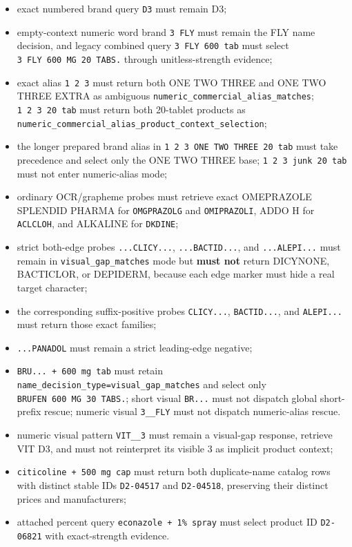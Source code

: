 \begin{itemize}
\item
  exact numbered brand query \texttt{D3} must remain D3;
\item
  empty-context numeric word brand \texttt{3\ FLY} must remain the FLY name decision, and legacy combined query \texttt{3\ FLY\ 600\ tab} must select \texttt{3\ FLY\ 600\ MG\ 20\ TABS.} through unitless-strength evidence;
\item
  exact alias \texttt{1\ 2\ 3} must return both ONE TWO THREE and ONE TWO THREE EXTRA as ambiguous \texttt{numeric\_\allowbreak{}commercial\_\allowbreak{}alias\_\allowbreak{}matches}; \texttt{1\ 2\ 3\ 20\ tab} must return both 20-tablet products as \texttt{numeric\_\allowbreak{}commercial\_\allowbreak{}alias\_\allowbreak{}product\_\allowbreak{}context\_\allowbreak{}selection};
\item
  the longer prepared brand alias in \texttt{1\ 2\ 3\ ONE\ TWO\ THREE\ 20\ tab} must take precedence and select only the ONE TWO THREE base; \texttt{1\ 2\ 3\ junk\ 20\ tab} must not enter numeric-alias mode;
\item
  ordinary OCR/grapheme probes must retrieve exact OMEPRAZOLE SPLENDID PHARMA for \texttt{OMGPRAZOLG} and \texttt{OMIPRAZOLI}, ADDO H for \texttt{ACLCLOH}, and ALKALINE for \texttt{DKDINE};
\item
  strict both-edge probes \texttt{...CLICY...}, \texttt{...BACTID...}, and \texttt{...ALEPI...} must remain in \texttt{visual\_\allowbreak{}gap\_\allowbreak{}matches} mode but \textbf{must not} return DICYNONE, BACTICLOR, or DEPIDERM, because each edge marker must hide a real target character;
\item
  the corresponding suffix-positive probes \texttt{CLICY...}, \texttt{BACTID...}, and \texttt{ALEPI...} must return those exact families;
\item
  \texttt{...PANADOL} must remain a strict leading-edge negative;
\item
  \texttt{BRU...\ +\ 600\ mg\ tab} must retain \texttt{name\_\allowbreak{}decision\_\allowbreak{}type=visual\_\allowbreak{}gap\_\allowbreak{}matches} and select only \texttt{BRUFEN\ 600\ MG\ 30\ TABS.}; short visual \texttt{BR...} must not dispatch global short-prefix rescue; numeric visual \texttt{3\_\allowbreak{}\_\allowbreak{}FLY} must not dispatch numeric-alias rescue.
\item
  numeric visual pattern \texttt{VIT\_\allowbreak{}\_\allowbreak{}3} must remain a visual-gap response, retrieve VIT D3, and must not reinterpret its visible 3 as implicit product context;
\item
  \texttt{citicoline\ +\ 500\ mg\ cap} must return both duplicate-name catalog rows with distinct stable IDs \texttt{D2-04517} and \texttt{D2-04518}, preserving their distinct prices and manufacturers;
\item
  attached percent query \texttt{econazole\ +\ 1\%\ spray} must select product ID \texttt{D2-06821} with exact-strength evidence.
\end{itemize}

